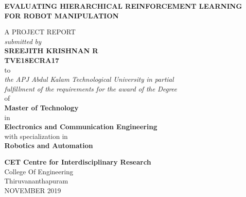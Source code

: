 \begin{titlepage}
	\thispagestyle{empty}
	\begin{center}
	\huge
	{\large \bf {EVALUATING HIERARCHICAL REINFORCEMENT LEARNING FOR ROBOT MANIPULATION}}\\
	\vspace{0.3cm}
	
	{\large A PROJECT REPORT}\\
	\vspace{-0.2cm}
	{\large {\it submitted by }}\\
	\vspace{-0.1cm}
	{ \Large \bf {SREEJITH KRISHNAN R}}\\
	\vspace{-0.3cm}
	{ \large \bf {TVE18ECRA17}}\\
	\vspace{-0.35cm}
	{ \large to}\\
	\vspace{-0.35cm}
	{ \large \it{the APJ Abdul Kalam Technological University in partial}}\\ 
	\vspace{-0.45cm}
	{ \large \it{fulfillment of the requirements for the award of  the Degree}}\\
	\vspace{-0.45cm}
	{\large \rm {of}}\\
	\vspace{0.15cm}
	{
		{ \large \bf {Master of Technology}}\\
		{\large \rm {in}}\\
		{ \large \bf {Electronics and Communication Engineering}}\\
		\vspace{0.15cm}
		{\large \rm {with specialization in}}\\
		\vspace{0.15cm}
		{ \large \bf {Robotics and Automation}}\\
	}
	\vspace{.18cm}
	\begin{figure}[ht]
		{\par}
	\end{figure}
	\vspace{-0.4cm}
	{\large \bf CET Centre for Interdisciplinary Research} \\
	
	{\large { College Of Engineering}}\\
	\vspace{-0.3cm}
	{\large {Thiruvananthapuram}}\\
	{\centering\large {NOVEMBER 2019}}\\
	\pagebreak
	\end{center}
\end{titlepage}